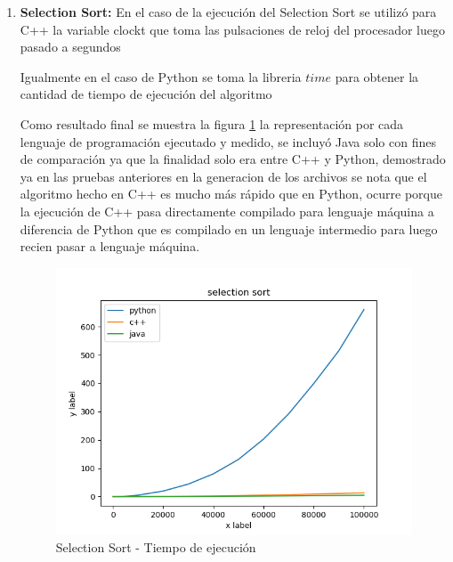 \documentclass{article}
\begin{document}
\begin{enumerate}
		                \item \textbf{Selection Sort: }
		                    En el caso de la ejecución del Selection Sort se utilizó para C++ la variable clock\textunderscore t que toma las pulsaciones de reloj del procesador luego pasado a segundos
		                    
		                    
		                    
		                    Igualmente en el caso de Python se toma la libreria $time$ para obtener la cantidad de tiempo de ejecución del algoritmo
		                    
		                    
		                    
		                    Como resultado final se muestra la figura \ref{fig:selection_diagram} la representación por cada lenguaje de programación ejecutado y medido, se incluyó Java solo con fines de comparación ya que la finalidad solo era entre C++ y Python, demostrado ya en las pruebas anteriores en la generacion de los archivos se nota que el algoritmo hecho en C++ es mucho más rápido que en Python, ocurre porque la ejecución de C++ pasa directamente compilado para lenguaje máquina a diferencia de Python que es compilado en un lenguaje intermedio para luego recien pasar a lenguaje máquina.
		                    
		                    \begin{figure}[H]
                				\centering
                				\includegraphics[scale=0.60]{img/selection_diagram.png}
                				\caption{Selection Sort - Tiempo de ejecución}
                				\label{fig:selection_diagram}
                			\end{figure}
		                    
		                
		            \end{enumerate}
		        
\end{document}
